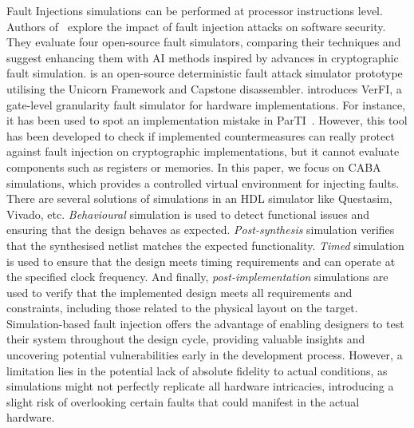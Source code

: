Fault Injections simulations can be performed at processor instructions level. Authors of~\cite{AB-23-acns} explore the impact of fault injection attacks on software security. They evaluate four open-source fault simulators, comparing their techniques and suggest enhancing them with AI methods inspired by advances in cryptographic fault simulation. \cite{fisim} is an open-source deterministic fault attack simulator prototype utilising the Unicorn Framework and Capstone disassembler.
\cite{AWMN-20-host} introduces VerFI, a gate-level granularity fault simulator for hardware implementations. For instance, it has been used to spot an implementation mistake in ParTI~\cite{SMG-16-crypto}.
However, this tool has been developed to check if implemented countermeasures can really protect against fault injection on cryptographic implementations, but it cannot evaluate components such as registers or memories.
In this paper, we focus on CABA simulations, which provides a controlled virtual environment for injecting faults. There are several solutions of simulations in an HDL simulator like Questasim, Vivado, etc. \textit{Behavioural} simulation is used to detect functional issues and ensuring that the design behaves as expected. \textit{Post-synthesis} simulation verifies that the synthesised netlist matches the expected functionality. \textit{Timed} simulation is used to ensure that the design meets timing requirements and can operate at the specified clock frequency. And finally, \textit{post-implementation} simulations are used to verify that the implemented design meets all requirements and constraints, including those related to the physical layout on the target.
Simulation-based fault injection offers the advantage of enabling designers to test their system throughout the design cycle, providing valuable insights and uncovering potential vulnerabilities early in the development process. However, a limitation lies in the potential lack of absolute fidelity to actual conditions, as simulations might not perfectly replicate all hardware intricacies, introducing a slight risk of overlooking certain faults that could manifest in the actual hardware.

